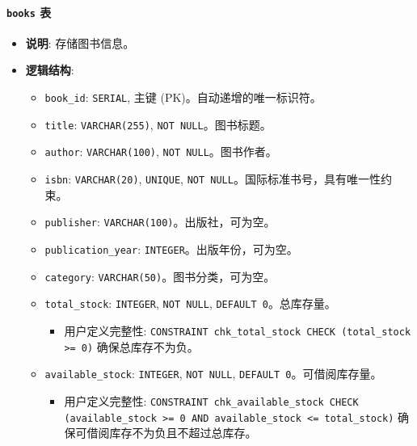 \documentclass[11pt, a4paper]{article}
\begin{document}
\paragraph{\texttt{books} 表}
\begin{itemize}
    \item \textbf{说明}: 存储图书信息。
    \item \textbf{逻辑结构}:
    \begin{itemize}
        \item \texttt{book\_id}: \texttt{SERIAL}, 主键 (PK)。自动递增的唯一标识符。
        \item \texttt{title}: \texttt{VARCHAR(255)}, \texttt{NOT NULL}。图书标题。
        \item \texttt{author}: \texttt{VARCHAR(100)}, \texttt{NOT NULL}。图书作者。
        \item \texttt{isbn}: \texttt{VARCHAR(20)}, \texttt{UNIQUE}, \texttt{NOT NULL}。国际标准书号，具有唯一性约束。
        \item \texttt{publisher}: \texttt{VARCHAR(100)}。出版社，可为空。
        \item \texttt{publication\_year}: \texttt{INTEGER}。出版年份，可为空。
        \item \texttt{category}: \texttt{VARCHAR(50)}。图书分类，可为空。
        \item \texttt{total\_stock}: \texttt{INTEGER}, \texttt{NOT NULL}, \texttt{DEFAULT 0}。总库存量。
        \begin{itemize}
            \item 用户定义完整性: \texttt{CONSTRAINT chk\_total\_stock CHECK (total\_stock >= 0)} 确保总库存不为负。
        \end{itemize}
        \item \texttt{available\_stock}: \texttt{INTEGER}, \texttt{NOT NULL}, \texttt{DEFAULT 0}。可借阅库存量。
        \begin{itemize}
            \item 用户定义完整性: \texttt{CONSTRAINT chk\_available\_stock CHECK (available\_stock >= 0 AND available\_stock <= total\_stock)} 确保可借阅库存不为负且不超过总库存。
        \end{itemize}
    \end{itemize}
\end{itemize}
\end{document}
